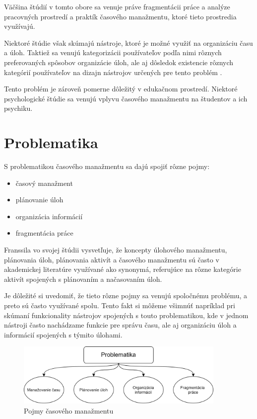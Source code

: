 \documentclass[10pt,slovak,a4paper]{article}
\begin{document}
	Väčšina štúdií v tomto obore \cite{Franssila,NoTask,Blandford} sa venuje práve fragmentácii práce a analýze pracovných prostredí a praktík časového manažmentu, ktoré tieto prostredia využívajú.
	
	Niektoré štúdie \cite{Franssila, Blandford, Haraty} však skúmajú nástroje, ktoré je možné využiť na organizáciu času a úloh. Taktiež sa venujú kategorizácii používateľov podľa nimi rôznych preferovaných spôsobov organizácie úloh, ale aj dôsledok existencie rôznych kategórií používateľov na dizajn nástrojov určených pre tento problém \cite{Haraty}.
	
	Tento problém je zároveň pomerne dôležitý v edukačnom prostredí. Niektoré psychologické štúdie \cite{Macan} sa venujú vplyvu časového manažmentu na študentov a ich psychiku.
	
\section{Problematika}

	S problematikou časového manažmentu sa dajú spojiť rôzne pojmy:
	\begin{itemize}
		\item časový manažment
		\item plánovanie úloh
		\item organizácia informácií
		\item fragmentácia práce
	\end{itemize}

	Franssila vo svojej štúdii\cite{Franssila} vysvetľuje, že koncepty úlohového manažmentu, plánovania úloh, plánovania aktivít a časového manažmentu sú často v akademickej literatúre využívané ako synonymá, referujúce na rôzne kategórie aktivít spojených s plánovaním a načasovaním úloh\cite{Franssila}.
	
	Je dôležité si uvedomiť, že tieto rôzne pojmy sa venujú spoločnému problému, a preto sú často využívané spolu. Tento fakt si môžeme všimnúť napríklad pri skúmaní funkcionality nástrojov spojených s touto problematikou, kde v jednom nástroji často nachádzame funkcie pre správu času, ale aj organizáciu úloh a informácií spojených s týmito úlohami.
	
	\par
	\begin{figure}[tbh]
		\centering
		\includegraphics[width=0.9\textwidth]{problematika.png}
	\caption{Pojmy časového manažmentu}
	\label{f:rozhod}
	\end{figure}
	
\end{document}
